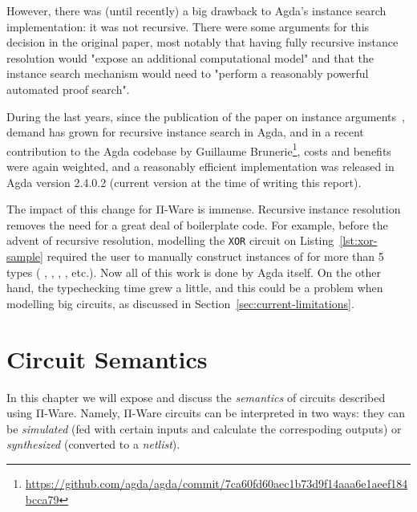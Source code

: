             However, there was (until recently) a big drawback to Agda's instance search implementation:
            it was not recursive.
            There were some arguments for this decision in the original paper,
            most notably that having fully recursive instance resolution would
            "expose an additional computational model" and that the instance search mechanism
            would need to "perform a reasonably powerful automated proof search".

            During the last years, since the publication of the paper on instance arguments~\cite{typeclasses-agda},
            demand has grown for recursive instance search in Agda, and in a recent contribution to the Agda codebase
            by Guillaume Brunerie\footnote{\url{https://github.com/agda/agda/commit/7ca60fd60aec1b73d9f14aaa6e1aeef184bcca79}},
            costs and benefits were again weighted, and a reasonably efficient implementation was released
            in Agda version 2.4.0.2 (current version at the time of writing this report).

            The impact of this change for Π-Ware is immense.
            Recursive instance resolution removes the need for a great deal of boilerplate code.
            For example, before the advent of recursive resolution, modelling the \texttt{XOR} circuit
            on Listing~\ref{lst:xor-sample} required the user to manually construct instances of 
            for more than 5 types
            (   
            , \AY{(}  \AY{)}  
            ,   \AY{(}  \AY{)}
            , \AY{(}  \AY{(}  \AY{)}\AY{)}  \AY{(}  \AY{)}
            , etc.).
            Now all of this work is done by Agda itself.
            On the other hand, the typechecking time grew a little,
            and this could be a problem when modelling big circuits, as discussed in Section~\ref{sec:current-limitations}.


    \section{Circuit Semantics}
    \label{sec:circuit-semantics}
        In this chapter we will expose and discuss the \emph{semantics} of circuits described using Π-Ware.
        Namely, Π-Ware circuits can be interpreted in two ways:
        they can be \emph{simulated} (fed with certain inputs and calculate the correspoding outputs)
        or \emph{synthesized} (converted to a \emph{netlist}).

